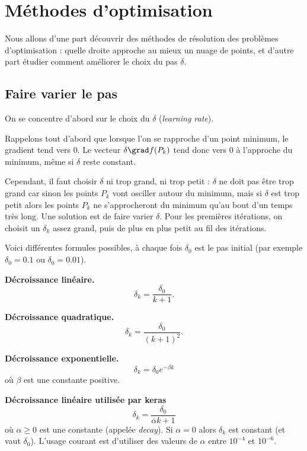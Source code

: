 \section{Méthodes d'optimisation}

Nous allons d'une part découvrir des méthodes de résolution  des problèmes d'optimisation : quelle droite approche au mieux un nuage de points, et d'autre part étudier comment améliorer le choix du pas $\delta$.



\subsection{Faire varier le pas}

On se concentre d'abord sur le choix du   $\delta$ (\emph{learning rate}).

Rappelons tout d'abord que lorsque l'on se rapproche d'un point minimum, le gradient tend vers $0$. Le vecteur $\delta \grad f(P_k)$ tend donc vers $0$ à l'approche du minimum, même si $\delta$ reste constant.

Cependant, il faut choisir $\delta$ ni trop grand, ni trop petit : $\delta$ ne doit pas être trop grand car sinon les points $P_k$ vont osciller autour du minimum, mais si $\delta$ est trop petit alors les points $P_k$ ne s'approcheront du minimum qu'au bout d'un temps très long. Une solution est de faire varier $\delta$. Pour les premières itérations, on choisit un $\delta_k$ assez grand, puis de plus en plus petit au fil des itérations.

Voici différentes formules possibles, à chaque fois $\delta_0$ est le pas initial (par exemple $\delta_0=0.1$ ou $\delta_0=0.01$).

\textbf{Décroissance linéaire.}
$$\delta_k = \frac{\delta_0}{k+1}.$$

\textbf{Décroissance quadratique.}
$$\delta_k = \frac{\delta_0}{(k+1)^2}.$$

\textbf{Décroissance exponentielle.}
$$\delta_k = \delta_0 e^{-\beta k}$$
où $\beta$ est une constante positive.


\textbf{Décroissance linéaire utilisée par keras}
$$\delta_k = \frac{\delta_0}{\alpha k+1}$$
où $\alpha\ge0$ est une constante (appelée \emph{decay}).
Si $\alpha=0$ alors $\delta_k$ est constant (et vaut $\delta_0$).
L'usage courant est d'utiliser des valeurs de $\alpha$ entre $10^{-4}$ et $10^{-6}$.



